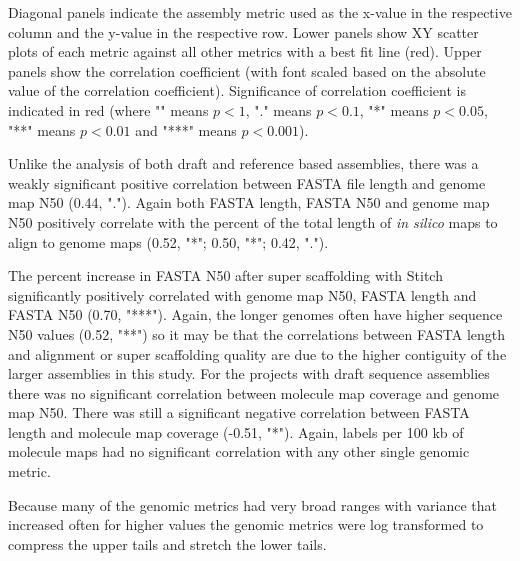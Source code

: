 Diagonal panels indicate the assembly metric used as the x-value in the respective column and the y-value in the respective row. Lower panels show XY scatter plots of each metric against all other metrics with a best fit line (red). Upper panels show the correlation coefficient (with font scaled based on the absolute value of the correlation coefficient). Significance of correlation coefficient is indicated in red (where "" means $p< 1$, "." means $p< 0.1$, "*" means $p< 0.05$, "**" means $p< 0.01$ and "***" means $p< 0.001$).


Unlike the analysis of both draft and reference based assemblies, there was a weakly significant positive correlation between FASTA file length and genome map N50 (0.44, "."). 
Again both FASTA length, FASTA N50 and genome map N50 positively correlate with the percent of the total length of \textit{in silico} maps to align to genome maps (0.52, "*"; 0.50, "*"; 0.42, "."). 


The percent increase in FASTA N50 after super scaffolding with Stitch significantly positively correlated with genome map N50, FASTA length and FASTA N50 (0.70, "***").
Again, the longer genomes often have higher sequence N50 values (0.52, "**") so it may be that the correlations between FASTA length and alignment or super scaffolding quality are due to the higher contiguity of the larger assemblies in this study.
For the projects with draft sequence assemblies there was no significant correlation between molecule map coverage and genome map N50. There was still a significant negative correlation between FASTA length and molecule map coverage (-0.51, "*").
Again, labels per 100 kb of molecule maps had no significant correlation with any other single genomic metric.


Because many of the genomic metrics had very broad ranges with variance that increased often for higher values the genomic metrics were log transformed to compress the upper tails and stretch the lower tails.